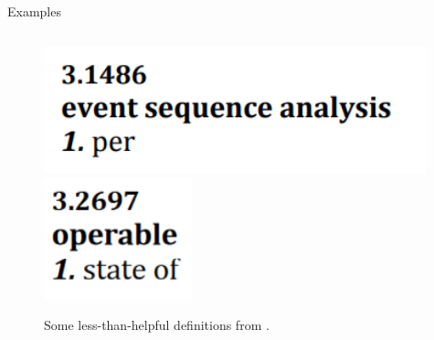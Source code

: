 \documentclass[22pt]{beamer}
\begin{document}
\begin{frame}[fragile]
\begin{textblock}{7.25}
\begin{block}{\fontsize{37}{20}\selectfont Examples}
\begin{columns}
\begin{column}{0.4\textwidth}
\begin{center}
\begin{figure}
                            \vspace{2mm}

                            \includegraphics[height=3.7cm]{per.png}
                            \includegraphics[height=3.5cm]{state of.png}
                            \label{Fig:unhelpful-defs}
                            \caption{Some less-than-helpful definitions from \cite{IEEE2017}.}
                        \end{figure}
                    \end{center}
                \end{column}
            \end{columns}




            \vspace{-5mm}
        \end{block}


\end{textblock}
\end{frame}
\end{document}
